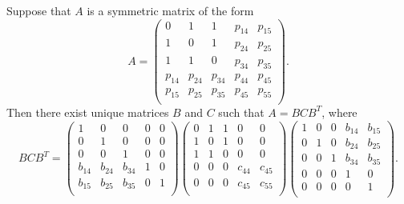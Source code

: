 \documentclass[10pt,a4paper]{amsart}
\begin{document}
\begin{lemma}\label{lem:factors}
Suppose that $A$ is a symmetric matrix of the form
\[
A=\begin{pmatrix}
0 & 1 & 1 & p_{14} & p_{15} \\
1 & 0 & 1 & p_{24} & p_{25} \\
1 & 1 & 0 & p_{34} & p_{35} \\
p_{14} & p_{24} & p_{34} & p_{44} & p_{45} \\
p_{15} & p_{25} & p_{35} & p_{45} & p_{55} \\
\end{pmatrix}.
\]
Then there exist unique matrices $B$ and $C$ such that $A=BCB^{T}$, where 
\[
BCB^{T}=\begin{pmatrix}
1 & 0 & 0 & 0 & 0 \\
0 & 1 & 0 & 0 & 0 \\
0 & 0 & 1 & 0 & 0 \\
b_{14} & b_{24} & b_{34} & 1 & 0 \\
b_{15} & b_{25} & b_{35} & 0 & 1 \\
\end{pmatrix}
\begin{pmatrix}
0 & 1 & 1 & 0 & 0 \\
1 & 0 & 1 & 0 & 0 \\
1 & 1 & 0 & 0 & 0\\
0 & 0 & 0 & c_{44} & c_{45} \\
0 & 0 & 0 & c_{45} & c_{55} \\
\end{pmatrix}
\begin{pmatrix}
1 & 0 & 0 & b_{14} & b_{15} \\
0 & 1 & 0 & b_{24} & b_{25} \\
0 & 0 & 1 & b_{34} & b_{35} \\
0 & 0 & 0 & 1 & 0 \\
0 & 0 & 0 & 0 & 1 \\
\end{pmatrix}.
\]
\end{lemma}
\end{document}
